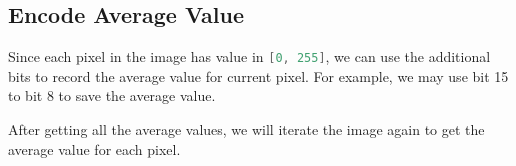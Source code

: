\subsection{Encode Average Value}
Since each pixel in the image has value in \lstinline[language=Java, basicstyle=\small\ttfamily, keywordstyle=\bfseries\color{green!40!black}]|[0, 255]|, we can use the additional bits to record the average value for current pixel. For example, we may use bit 15 to bit 8 to save the average value.

After getting all the average values, we will iterate the image again to get the average value for each pixel.
